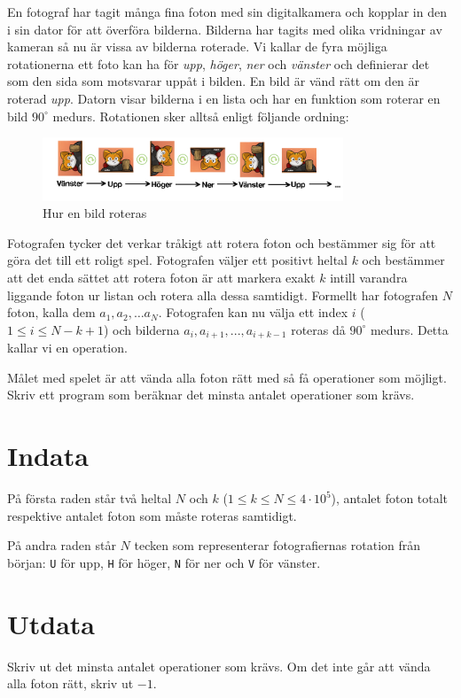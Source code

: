 En fotograf har tagit många fina foton med sin digitalkamera och kopplar in den
i sin dator för att överföra bilderna. Bilderna har tagits med olika vridningar
av kameran så nu är vissa av bilderna roterade. Vi kallar de fyra möjliga
rotationerna ett foto kan ha för \emph{upp}, \emph{höger}, \emph{ner} och \emph{vänster} och
definierar det som den sida som motsvarar uppåt i bilden. En bild är vänd rätt
om den är roterad \emph{upp}. Datorn visar bilderna i en lista och har en funktion
som roterar en bild $90^\circ$ medurs. Rotationen sker alltså enligt följande ordning:

\begin{figure}[h!]
    \centering
    \includegraphics[width=0.8\textwidth]{fotografen.png}
\caption{Hur en bild roteras}
\label{fig:rotatingcat}
\end{figure}


Fotografen tycker det verkar tråkigt att rotera foton och bestämmer sig för att
göra det till ett roligt spel. Fotografen väljer ett positivt heltal $k$ och
bestämmer att det enda sättet att rotera foton är att markera exakt $k$ intill varandra liggande foton
ur listan och rotera alla dessa samtidigt. Formellt har fotografen $N$ foton, kalla dem $a_1, a_2, \dots
a_N$. Fotografen kan nu välja ett index $i$ ($1 \leq i \leq N-k+1$)
och bilderna $a_i, a_{i+1}, ... , a_{i+k-1}$ roteras då $90^\circ$ medurs. Detta kallar vi en
operation.

Målet med spelet är att vända alla foton rätt med så få operationer som
möjligt. Skriv ett program som beräknar det minsta antalet operationer som krävs.

\section*{Indata}
På första raden står två heltal $N$ och $k$ ($1 \leq k \leq N \leq 4 \cdot 10 ^5$),
antalet foton totalt respektive antalet foton som måste roteras samtidigt.

På andra raden står $N$ tecken som representerar fotografiernas rotation från
början: \texttt{U} för upp, \texttt{H} för höger, \texttt{N} för ner och
\texttt{V} för vänster.

\section*{Utdata}
Skriv ut det minsta antalet operationer som krävs. Om det inte går att vända
alla foton rätt, skriv ut $-1$.

